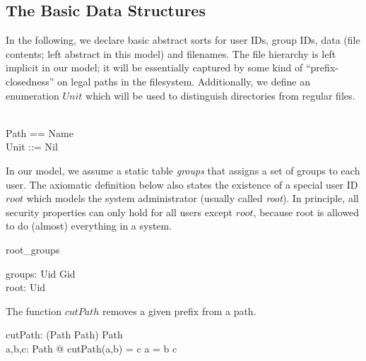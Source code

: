 \subsection{The Basic Data Structures}

\vspace{1ex}\noindent

In the following, we declare basic abstract sorts for \unix user IDs,
group IDs, data (file contents; left abstract in this
model) and filenames. The
file hierarchy is left implicit in our model; it will be essentially
captured by some kind of ``prefix-closedness'' on legal paths in the
filesystem.  Additionally, we define an enumeration $Unit$ which will
be used to distinguish directories from regular files.
\begin{zed}
   \\
  Path == \seq Name \\
  Unit ::= Nil \\
\end{zed}

In our model, we assume a static table \emph{groups} that assigns a set of
groups to each user. The axiomatic definition below also states the existence
of a special user ID $root$ which models the system administrator (usually
called \textit{root}). In principle, all security properties can only hold for
all users except $root$, because root is allowed to do (almost) everything in a
\unix system.
\begin{doc}{root_groups}
  \begin{axdef}
    groups: Uid \fun \power Gid \\
    root: Uid \\
  \end{axdef}
\end{doc}

The function $cutPath$ removes a given prefix from a path.
\begin{axdef}
  cutPath: (Path \cross Path) \pfun Path \\
  \where
  \forall a,b,c: Path @ cutPath(a,b) = c \iff  a = b \cat c \\
\end{axdef}

